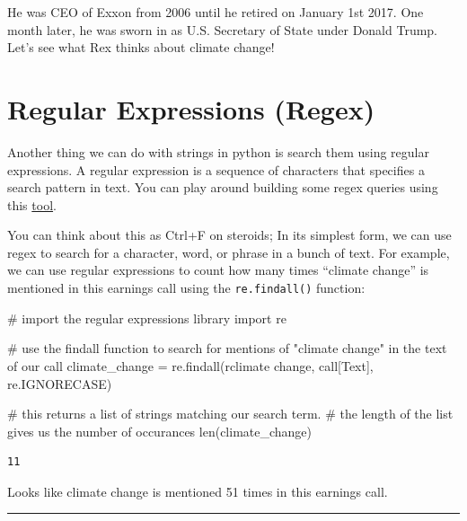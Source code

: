 \documentclass[
  letterpaper,
  DIV=11,
  numbers=noendperiod]{scrreprt}
\newenvironment{Shaded}{\begin{snugshade}}{\end{snugshade}}
\newcommand{\BuiltInTok}[1]{\textcolor[rgb]{0.00,0.23,0.31}{#1}}
\newcommand{\CommentTok}[1]{\textcolor[rgb]{0.37,0.37,0.37}{#1}}
\newcommand{\ImportTok}[1]{\textcolor[rgb]{0.00,0.46,0.62}{#1}}
\newcommand{\NormalTok}[1]{\textcolor[rgb]{0.00,0.23,0.31}{#1}}
\newcommand{\OperatorTok}[1]{\textcolor[rgb]{0.37,0.37,0.37}{#1}}
\newcommand{\StringTok}[1]{\textcolor[rgb]{0.13,0.47,0.30}{#1}}
\newcommand{\VerbatimStringTok}[1]{\textcolor[rgb]{0.13,0.47,0.30}{#1}}
\begin{document}
He was CEO of Exxon from 2006 until he retired on January 1st 2017. One
month later, he was sworn in as U.S. Secretary of State under Donald
Trump. Let's see what Rex thinks about climate change!

\hypertarget{regular-expressions-regex}{%
\section{Regular Expressions (Regex)}\label{regular-expressions-regex}}

Another thing we can do with strings in python is search them using
regular expressions. A regular expression is a sequence of characters
that specifies a search pattern in text. You can play around building
some regex queries using this \href{https://regexr.com/}{tool}.

You can think about this as Ctrl+F on steroids; In its simplest form, we
can use regex to search for a character, word, or phrase in a bunch of
text. For example, we can use regular expressions to count how many
times ``climate change'' is mentioned in this earnings call using the
\texttt{re.findall()} function:

\begin{Shaded}
\begin{Highlighting}[]
\CommentTok{\# import the regular expressions library }
\ImportTok{import}\NormalTok{ re}

\CommentTok{\# use the findall function to search for mentions of "climate change" in the text of our call}
\NormalTok{climate\_change }\OperatorTok{=}\NormalTok{ re.findall(}\VerbatimStringTok{r\textquotesingle{}climate change\textquotesingle{}}\NormalTok{, call[}\StringTok{\textquotesingle{}Text\textquotesingle{}}\NormalTok{], re.IGNORECASE)}

\CommentTok{\# this returns a list of strings matching our search term. }
\CommentTok{\# the length of the list gives us the number of occurances}
\BuiltInTok{len}\NormalTok{(climate\_change)}
\end{Highlighting}
\end{Shaded}

\begin{verbatim}
11
\end{verbatim}

Looks like climate change is mentioned 51 times in this earnings call.

\begin{center}\rule{0.5\linewidth}{0.5pt}\end{center}
\end{document}
